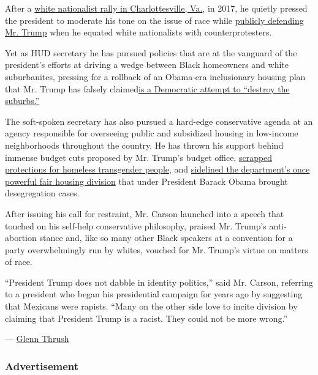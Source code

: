 After a
\href{https://www.nytimes3xbfgragh.onion/2017/08/12/us/charlottesville-protest-white-nationalist.html}{white
nationalist rally in Charlottesville, Va.}, in 2017, he quietly pressed
the president to moderate his tone on the issue of race while
\href{https://www.washingtonpost.com/news/politics/wp/2017/08/16/ben-carson-calls-criticism-of-trumps-charlottesville-response-little-squabbles-being-blown-out-of-proportion/}{publicly
defending Mr. Trump} when he equated white nationalists with
counterprotesters.

Yet as HUD secretary he has pursued policies that are at the vanguard of
the president's efforts at driving a wedge between Black homeowners and
white suburbanites, pressing for a rollback of an Obama-era inclusionary
housing plan that Mr. Trump has falsely
claimed\href{https://www.nytimes3xbfgragh.onion/2020/07/01/us/politics/trump-obama-housing-discrimination.html}{is
a Democratic attempt to ``destroy the suburbs.''}

The soft-spoken secretary has also pursued a hard-edge conservative
agenda at an agency responsible for overseeing public and subsidized
housing in low-income neighborhoods throughout the country. He has
thrown his support behind immense budget cuts proposed by Mr. Trump's
budget office,
\href{https://www.nytimes3xbfgragh.onion/2020/07/01/us/politics/hud-transgender.html}{scrapped
protections for homeless transgender people,} and
\href{https://www.nytimes3xbfgragh.onion/2018/03/28/us/ben-carson-hud-fair-housing-discrimination.html}{sidelined
the department's once powerful fair housing division} that under
President Barack Obama brought desegregation cases.

After issuing his call for restraint, Mr. Carson launched into a speech
that touched on his self-help conservative philosophy, praised Mr.
Trump's anti-abortion stance and, like so many other Black speakers at a
convention for a party overwhelmingly run by whites, vouched for Mr.
Trump's virtue on matters of race.

``President Trump does not dabble in identity politics,'' said Mr.
Carson, referring to a president who began his presidential campaign for
years ago by suggesting that Mexicans were rapists. ``Many on the other
side love to incite division by claiming that President Trump is a
racist. They could not be more wrong.''

--- \href{https://www.nytimes3xbfgragh.onion/by/glenn-thrush}{Glenn
Thrush}

\hypertarget{advertisement-5}{%
\subsubsection{Advertisement}\label{advertisement-5}}

